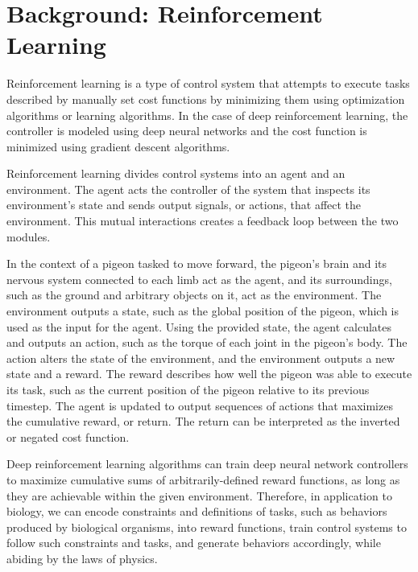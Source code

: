 \chapter{Background: Reinforcement Learning}
  Reinforcement learning is a type of control system that attempts to execute tasks described by manually set cost functions by minimizing them using optimization algorithms or learning algorithms. In the case of deep reinforcement learning, the controller is modeled using deep neural networks and the cost function is minimized using gradient descent algorithms.

  Reinforcement learning divides control systems into an agent and an environment. The agent acts the controller of the system that inspects its environment's state and sends output signals, or actions, that affect the environment. This mutual interactions creates a feedback loop between the two modules.

  In the context of a pigeon tasked to move forward, the pigeon's brain and its nervous system connected to each limb act as the agent, and its surroundings, such as the ground and arbitrary objects on it, act as the environment. The environment outputs a state, such as the global position of the pigeon, which is used as the input for the agent. Using the provided state, the agent calculates and outputs an action, such as the torque of each joint in the pigeon's body. The action alters the state of the environment, and the environment outputs a new state and a reward. The reward describes how well the pigeon was able to execute its task, such as the current position of the pigeon relative to its previous timestep. The agent is updated to output sequences of actions that maximizes the cumulative reward, or return. The return can be interpreted as the inverted or negated cost function.

  Deep reinforcement learning algorithms can train deep neural network controllers to maximize cumulative sums of arbitrarily-defined reward functions, as long as they are achievable within the given environment. Therefore, in application to biology, we can encode constraints and definitions of tasks, such as behaviors produced by biological organisms, into reward functions, train control systems to follow such constraints and tasks, and generate behaviors accordingly, while abiding by the laws of physics.

